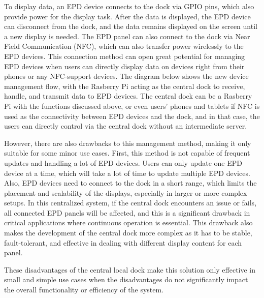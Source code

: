 \documentclass[../Main.tex]{subfiles}
\begin{document}
To display data, an \gls{EPD} device connects to the dock via GPIO pins, which also provide power for the display task. After the data is displayed, the \gls{EPD} device can disconnect from the dock, and the data remains displayed on the screen until a new display is needed. The \gls{EPD} panel can also connect to the dock via Near Field Communication (NFC), which can also transfer power wirelessly to the \gls{EPD} devices. This connection method can open great potential for managing \gls{EPD} devices when users can directly display data on devices right from their phones or any NFC-support devices. The diagram below shows the new device management flow, with the Rasberry Pi acting as the central dock to receive, handle, and transmit data to \gls{EPD} devices. The central dock can be a Rasberry Pi with the functions discussed above, or even users' phones and tablets if NFC is used as the connectivity between \gls{EPD} devices and the dock, and in that case, the users can directly control via the central dock without an intermediate server.

However, there are also drawbacks to this management method, making it only suitable for some minor use cases. First, this method is not capable of frequent updates and handling a lot of \gls{EPD} devices. Users can only update one \gls{EPD} device at a time, which will take a lot of time to update multiple \gls{EPD} devices. Also, \gls{EPD} devices need to connect to the dock in a short range, which limits the placement and scalability of the displays, especially in larger or more complex setups. In this centralized system, if the central dock encounters an issue or fails, all connected \gls{EPD} panels will be affected, and this is a significant drawback in critical applications where continuous operation is essential. This drawback also makes the development of the central dock more complex as it has to be stable, fault-tolerant, and effective in dealing with different display content for each panel.

These disadvantages of the central local dock make this solution only effective in small and simple use cases when the disadvantages do not significantly impact the overall functionality or efficiency of the system.
\end{document}

